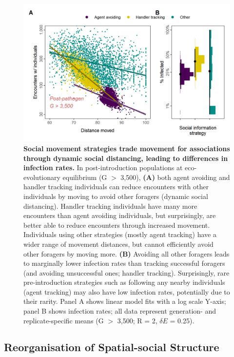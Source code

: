 \begin{figure}[!h]
    \centering
    \includegraphics[width=0.7\linewidth]{figures/pathomove/fig_social_outcomes.png}
    \caption{
        \textbf{Social movement strategies trade movement for associations through dynamic social distancing, leading to differences in infection rates.}
        In post-introduction populations at eco-evolutionary equilibrium (G $>$ 3,500), \textbf{(A)} both agent avoiding and handler tracking individuals can reduce encounters with other individuals by moving to avoid other foragers (dynamic social distancing).
        Handler tracking individuals have many more encounters than agent avoiding individuals, but surprisingly, are better able to reduce encounters through increased movement.
        Individuals using other strategies (mostly agent tracking) have a wider range of movement distances, but cannot efficiently avoid other foragers by moving more.
        \textbf{(B)} Avoiding all other foragers leads to marginally lower infection rates than tracking successful foragers (and avoiding unsuccessful ones; handler tracking).
        Surprisingly, rare pre-introduction strategies such as following any nearby individuals (agent tracking) may also have low infection rates, potentially due to their rarity.
        Panel A shows linear model fits with a log scale Y-axis; panel B shows infection rates; all data represent generation- and replicate-specific means (G $>$ 3,500; R = 2, $\delta E$ = 0.25).
    }\label{fig_social_outcomes}
\end{figure}

\subsection*{Reorganisation of Spatial-social Structure}

